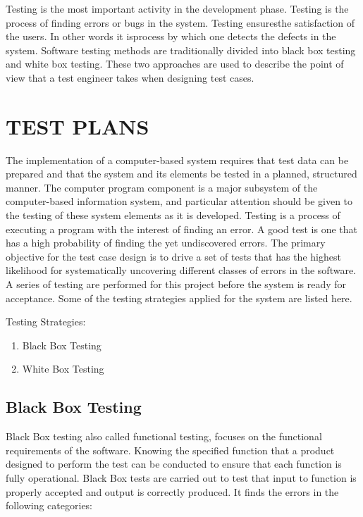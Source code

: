 \documentclass[11pt]{report} %
\begin{document}
Testing is the most important activity in the development phase. Testing is the process of    finding   errors or bugs in the system. Testing ensuresthe satisfaction of the users. In other words it isprocess by which one detects the defects in the system. Software testing methods are  traditionally divided into black box testing and white box testing. These two approaches are used to describe the point of view that a test engineer takes when designing test cases.

\section{TEST PLANS}
\label{sec:TEST PLANS}

The implementation of a computer-based system requires that test data can be prepared and that the system and its elements be tested in a planned, structured manner. The computer program component is a major subsystem of the computer-based information system, and particular attention should be given to the testing of these system elements as it is developed.
Testing is a process of executing a program with the interest of finding an error. A good test is one that has a high probability of finding the yet undiscovered errors. The primary objective for the test case design is to drive a set of tests that has the highest likelihood for systematically uncovering different classes of errors in the software. A series of testing are performed for this project before the system is ready for acceptance.  Some of the testing strategies applied for the system are listed here.

Testing Strategies: 
\begin{enumerate}
	\item Black Box Testing
	\item White Box Testing
\end{enumerate}

\subsection{Black Box Testing}
\label{subsec:Black Box Testing}

Black Box testing also called functional testing, focuses on the functional requirements of the software. Knowing the specified function that a product designed to perform the test can be conducted to ensure that each function is fully operational. Black Box tests are carried out to test that input to function is properly accepted and output is correctly produced. It finds the errors in the following categories:
\end{document}
